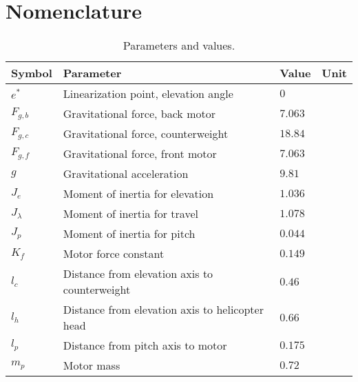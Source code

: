 \appendix\section{Nomenclature}\label{sec:nomenclature}


\begin{table}[h!]
	\centering
	\caption{Parameters and values.}
	\begin{tabular}{llll}
		\toprule
		Symbol & Parameter & Value & Unit \\
		\midrule
	    $e^\ast$    & Linearization point, elevation angle            & $0$     & \rad                        \\
		$F_{g,b}$   & Gravitational force, back motor                 & $7.063$ & \newton                     \\
		$F_{g,c}$   & Gravitational force, counterweight              & $18.84$ & \newton                     \\
		$F_{g,f}$   & Gravitational force, front motor                & $7.063$ & \newton                     \\
		$g$         & Gravitational acceleration                      & $9.81$  & \meter\per\second\squared   \\
		$J_e$       & Moment of inertia for elevation                 & $1.036$ & \kilogram\usk\meter\squared \\
		$J_\lambda$ & Moment of inertia for travel                    & $1.078$ & \kilogram\usk\meter\squared \\
		$J_p$       & Moment of inertia for pitch                     & $0.044$ & \kilogram\usk\meter\squared \\
		$K_f$       & Motor force constant                            & $0.149$ & \newton\per\volt            \\
		$l_{c}$     & Distance from elevation axis to counterweight   & $0.46$  & \meter                      \\
		$l_{h}$     & Distance from elevation axis to helicopter head & $0.66$  & \meter                      \\
		$l_{p}$     & Distance from pitch axis to motor               & $0.175$ & \meter                      \\
		$m_{p}$     & Motor mass                                      & $0.72$  & \kilogram                   \\

\end{tabular}
\end{table}

